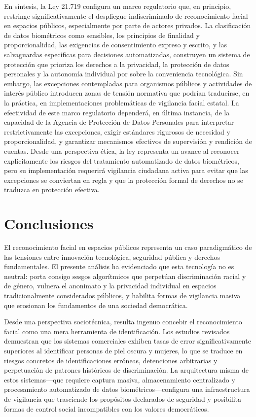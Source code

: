 \documentclass[11pt, a4paper]{article}
\begin{document}
En síntesis, la Ley 21.719 configura un marco regulatorio que, en principio, restringe significativamente el despliegue indiscriminado de reconocimiento facial en espacios públicos, especialmente por parte de actores privados. La clasificación de datos biométricos como sensibles, los principios de finalidad y proporcionalidad, las exigencias de consentimiento expreso y escrito, y las salvaguardas específicas para decisiones automatizadas, construyen un sistema de protección que prioriza los derechos a la privacidad, la protección de datos personales y la autonomía individual por sobre la conveniencia tecnológica. Sin embargo, las excepciones contempladas para organismos públicos y actividades de interés público introducen zonas de tensión normativa que podrían traducirse, en la práctica, en implementaciones problemáticas de vigilancia facial estatal. La efectividad de este marco regulatorio dependerá, en última instancia, de la capacidad de la Agencia de Protección de Datos Personales para interpretar restrictivamente las excepciones, exigir estándares rigurosos de necesidad y proporcionalidad, y garantizar mecanismos efectivos de supervisión y rendición de cuentas. Desde una perspectiva ética, la ley representa un avance al reconocer explícitamente los riesgos del tratamiento automatizado de datos biométricos, pero su implementación requerirá vigilancia ciudadana activa para evitar que las excepciones se conviertan en regla y que la protección formal de derechos no se traduzca en protección efectiva.

\section{Conclusiones}

El reconocimiento facial en espacios públicos representa un caso paradigmático de las tensiones entre innovación tecnológica, seguridad pública y derechos fundamentales. El presente análisis ha evidenciado que esta tecnología no es neutral: porta consigo sesgos algorítmicos que perpetúan discriminación racial y de género, vulnera el anonimato y la privacidad individual en espacios tradicionalmente considerados públicos, y habilita formas de vigilancia masiva que erosionan los fundamentos de una sociedad democrática.

Desde una perspectiva sociotécnica, resulta ingenuo concebir el reconocimiento facial como una mera herramienta de identificación. Los estudios revisados demuestran que los sistemas comerciales exhiben tasas de error significativamente superiores al identificar personas de piel oscura y mujeres, lo que se traduce en riesgos concretos de identificaciones erróneas, detenciones arbitrarias y perpetuación de patrones históricos de discriminación. La arquitectura misma de estos sistemas---que requiere captura masiva, almacenamiento centralizado y procesamiento automatizado de datos biométricos---configura una infraestructura de vigilancia que trasciende los propósitos declarados de seguridad y posibilita formas de control social incompatibles con los valores democráticos.
\end{document}
